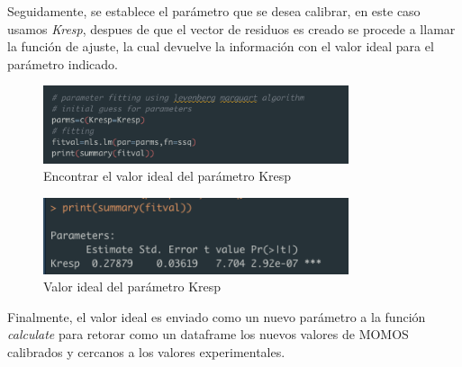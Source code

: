 Seguidamente, se establece el par\'ametro que se desea calibrar, en este caso usamos \textit{Kresp}, despues de que el vector de residuos es creado se procede a llamar la funci\'on de ajuste, la cual devuelve la informaci\'on con el valor ideal para el par\'ametro indicado.

\begin{figure}[H]
  \centering
    \begin{minipage}{0.8\textwidth}
      \centering
      \includegraphics[width=0.8\textwidth]{figure_4_16.png}
      \caption{Encontrar el valor ideal del par\'ametro Kresp}
      \label{fig:Fig}
    \end{minipage}%
    \hspace{5mm}
\end{figure}

\begin{figure}[H]
  \centering
    \begin{minipage}{0.8\textwidth}
      \centering
      \includegraphics[width=0.8\textwidth]{figure_4_17.png}
      \caption{Valor ideal del par\'ametro Kresp}
      \label{fig:Fig}
    \end{minipage}%
    \hspace{5mm}
\end{figure}

Finalmente, el valor ideal es enviado como un nuevo par\'ametro a la funci\'on \textit{calculate} para retorar como un dataframe los nuevos valores de MOMOS calibrados y cercanos a los valores experimentales.

